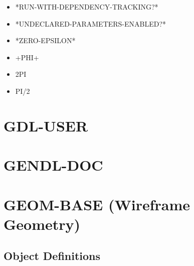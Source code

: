 \documentclass [11pt]{book}
\begin{document}
\begin{itemize}
\item {}*RUN-WITH-DEPENDENCY-TRACKING?*

\item {}*UNDECLARED-PARAMETERS-ENABLED?*

\item {}*ZERO-EPSILON*

\item {}+PHI+

\item {}2PI

\item {}PI/2

\end{itemize}





\section{GDL-USER }

\label{sec:gdl-user}







\section{GENDL-DOC }

\label{sec:gendl-doc}







\section{GEOM-BASE (Wireframe Geometry)}

\label{sec:geom-base(wireframegeometry)}





\subsection{Object Definitions}

\label{subsec:objectdefinitions}
\end{document}
